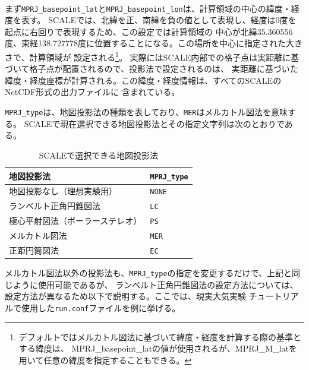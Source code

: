 {\small {\gt
{}}}\\

\noindent まず\verb|MPRJ_basepoint_lat|と\verb|MPRJ_basepoint_lon|は、計算領域の中心の緯度・経度を表す。
SCALEでは、北緯を正、南緯を負の値として表現し、経度は0度を起点に右回りで表現するため、この設定では計算領域の
中心が北緯35.360556度、東経138.727778度に位置することになる。この場所を中心に指定された大きさで、計算領域が
設定される\footnote{デフォルトではメルカトル図法に基づいて緯度・経度を計算する際の基準とする緯度は、
MPRJ\_basepoint\_latの値が使用されるが、MPRJ\_M\_latを用いて任意の緯度を指定することもできる。}。
実際にはSCALE内部での格子点は実距離に基づいて格子点が配置されるので、投影法で設定されるのは、
実距離に基づいた緯度・経度座標が計算される。この緯度・経度情報は、すべてのSCALEのNetCDF形式の出力ファイルに
含まれている。

\verb|MPRJ_type|は、地図投影法の種類を表しており、\verb|MER|はメルカトル図法を意味する。
SCALEで現在選択できる地図投影法とその指定文字列は次のとおりである。

\begin{table}[htb]
\begin{center}
\caption{SCALEで選択できる地図投影法}
\begin{tabularx}{150mm}{|l|X|} \hline
 \rowcolor[gray]{0.9} 地図投影法 & \verb|MPRJ_type| \\ \hline
 地図投影なし（理想実験用）& \verb|NONE| \\ \hline
 ランベルト正角円錐図法 & \verb|LC| \\ \hline
 極心平射図法（ポーラーステレオ） & \verb|PS| \\ \hline
 メルカトル図法 & \verb|MER| \\ \hline
 正距円筒図法 & \verb|EC| \\ \hline
\end{tabularx}
\label{tab:map_proj}
\end{center}
\end{table}

メルカトル図法以外の投影法も、\verb|MPRJ_type|の指定を変更するだけで、上記と同じように使用可能であるが、
ランベルト正角円錐図法の設定方法については、設定方法が異なるため以下で説明する。ここでは、現実大気実験
チュートリアルで使用した\verb|run.conf|ファイルを例に挙げる。\\

